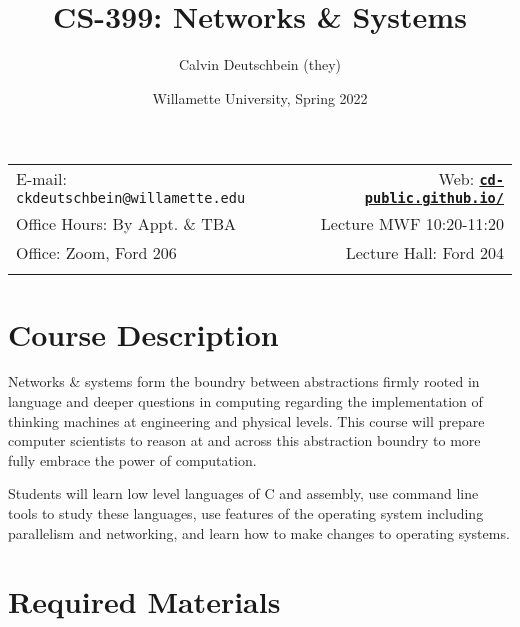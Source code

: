 \documentclass[11pt]{article}
\title{CS-399: Networks \& Systems}
\author{Calvin Deutschbein (they)}
\date{Willamette University, Spring 2022}
\newcommand{\blankline}{\quad\pagebreak[2]}
\begin{document}
\maketitle

\blankline

\begin{tabular*}{.93\textwidth}{@{\extracolsep{\fill}}lr}


E-mail: \texttt{ckdeutschbein@willamette.edu} & Web: \href{https://cd-public.github.io/courses/computer_security/451f21.html}{\tt\bf cd-public.github.io/}  \\

 Office Hours: By Appt. \& TBA  &  Lecture MWF 10:20-11:20 \\

 Office: Zoom, Ford 206 & Lecture Hall: Ford 204 \\
 & \\
\hline
\end{tabular*}

\vspace{5 mm}


\section*{Course Description}

 Networks \& systems form the boundry between abstractions firmly rooted in language and deeper questions in computing regarding the implementation of thinking machines at engineering and physical levels. This course will prepare computer scientists to reason at and across this abstraction boundry to more fully embrace the power of computation.

Students will learn low level languages of C and assembly, use command line tools to study these languages, use features of the operating system including parallelism and networking, and learn how to make changes to operating systems. 


\section*{Required Materials}
\end{document}
